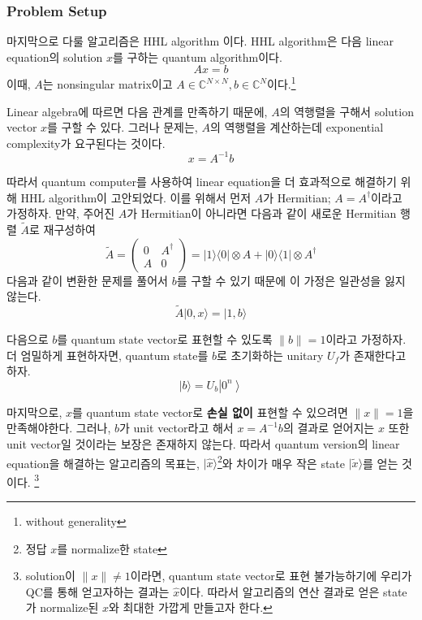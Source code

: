 \subsubsection{Problem Setup}
마지막으로 다룰 알고리즘은 HHL algorithm\cite{harrow2009quantum} 이다. HHL algorithm은 다음 linear equation의 solution $x$를 구하는 quantum algorithm이다. 
\begin{equation*}
  A x=b
\end{equation*}
이때, $A$는 nonsingular matrix이고 $A \in \mathbb C^{N \times N}, b \in \mathbb C^N$이다.\footnote{without generality}

Linear algebra에 따르면 다음 관계를 만족하기 때문에, $A$의 역행렬을 구해서 solution vector $x$를 구할 수 있다. 
그러나 문제는, $A$의 역행렬을 계산하는데 exponential complexity가 요구된다는 것이다.
\begin{equation*}
  x = A^{-1}b
\end{equation*}

따라서 quantum computer를 사용하여 linear equation을 더 효과적으로 해결하기 위해 HHL algorithm이 고안되었다. 
이를 위해서 먼저 $A$가 Hermitian; $A = A^\dagger$이라고 가정하자. 만약, 주어진 $A$가 Hermitian이 아니라면 다음과 같이 새로운 Hermitian 행렬 $\tilde A$로 재구성하여
\begin{equation*}
  \tilde{A}=\left(\begin{array}{cc}0 & A^{\dagger} \\ A & 0\end{array}\right)=|1\rangle\langle 0| \otimes A+|0\rangle\langle 1| \otimes A^{\dagger}
\end{equation*}
다음과 같이 변환한 문제를 풀어서 $b$를 구할 수 있기 때문에 이 가정은 일관성을 잃지 않는다. 
\begin{equation*}
  \tilde{A}|0, x\rangle=|1, b\rangle
\end{equation*}

다음으로 $b$를 quantum state vector로 표현할 수 있도록 $\|b\| = 1$이라고 가정하자. 더 엄밀하게 표현하자면, quantum state를 $b$로 초기화하는 unitary $U_f$가 존재한다고 하자.
\begin{equation*}
  |b\rangle=U_b\left|0^n\right\rangle
\end{equation*}

마지막으로, $x$를 quantum state vector로 \textbf{손실 없이} 표현할 수 있으려면 $\|x \| = 1$을 만족해야한다. 그러나, $b$가 unit vector라고 해서 $x = A^{-1}b$의 결과로 얻어지는 $x$ 또한 unit vector일 것이라는 보장은 존재하지 않는다.
따라서 quantum version의 linear equation을 해결하는 알고리즘의 목표는, 
$|\hat x\rangle$\footnote{정답 $x$를 normalize한 state}와 차이가 매우 작은 state $|\tilde x\rangle$를 얻는 것이다.
\footnote{solution이 $\|x\| \ne 1$이라면, quantum state vector로 표현 불가능하기에 우리가 QC를 통해 얻고자하는 결과는 $\hat x$이다. 따라서 알고리즘의 연산 결과로 얻은 state가 normalize된 $x$와 최대한 가깝게 만들고자 한다.}

